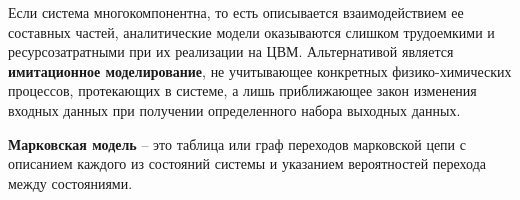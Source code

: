 Если система многокомпонентна, то есть описывается взаимодействием ее
составных частей, аналитические модели оказываются слишком трудоемкими и
ресурсозатратными при их реализации на ЦВМ. Альтернативой является
\textbf{имитационное моделирование}, не учитывающее конкретных
физико-химических процессов, протекающих в системе, а лишь приближающее
закон изменения входных данных при получении определенного набора выходных
данных.

\textbf{Марковская модель} -- это таблица или граф переходов марковской цепи с
описанием каждого из состояний системы и указанием вероятностей перехода
между состояниями.

\clearpage
